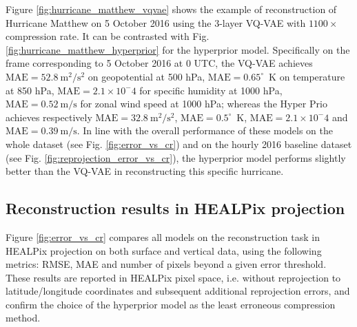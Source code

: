 \documentclass[11pt, a4paper, logo, copyright, numbering]{googledeepmind}
\begin{document}
Figure \ref{fig:hurricane_matthew_vqvae} shows the example of reconstruction of Hurricane Matthew on 5 October 2016 using the 3-layer VQ-VAE with $1100\times$ compression rate. It can be contrasted with Fig. \ref{fig:hurricane_matthew_hyperprior} for the hyperprior model. Specifically on the frame corresponding to 5 October 2016 at 0 UTC, the VQ-VAE achieves $\text{MAE}=52.8~\text{m}^2/\text{s}^2$ on geopotential at 500 hPa, $\text{MAE}=0.65^\circ$~K on temperature at 850 hPa, $\text{MAE}=2.1 \times 10^-4$ for specific humidity at 1000 hPa, $\text{MAE}=0.52~\text{m}/\text{s}$ for zonal wind speed at 1000 hPa; whereas the Hyper Prio achieves respectively $\text{MAE}=32.8~\text{m}^2/\text{s}^2$, $\text{MAE}=0.5^\circ$~K, $\text{MAE}=2.1\times10^-4$ and $\text{MAE}=0.39~\text{m}/\text{s}$. In line with the overall performance of these models on the whole dataset (see Fig. \ref{fig:error_vs_cr}) and on the hourly 2016 baseline dataset (see Fig. \ref{fig:reprojection_error_vs_cr}), the hyperprior model performs slightly better than the VQ-VAE in reconstructing this specific hurricane.

\subsection{Reconstruction results in HEALPix projection}

Figure \ref{fig:error_vs_cr} compares all models on the reconstruction task in HEALPix projection on both surface and vertical data, using the following metrics: RMSE, MAE and number of pixels beyond a given error threshold. These results are reported in HEALPix pixel space, i.e. without reprojection to latitude/longitude coordinates and subsequent additional reprojection errors, and confirm the choice of the hyperprior model as the least erroneous compression method.
\end{document}
